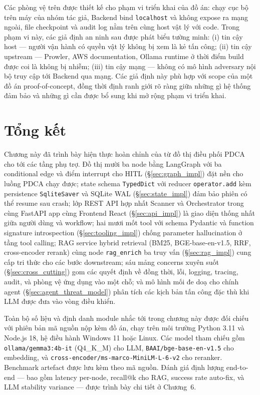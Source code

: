 Các phòng vệ trên được thiết kế cho phạm vi triển khai của đồ án: \sysname{} chạy cục bộ trên máy của nhóm tác giả, Backend bind \texttt{localhost} và không expose ra mạng ngoài, file checkpoint và audit log nằm trên cùng host vật lý với code. Trong phạm vi này, các giả định an ninh sau được phát biểu tường minh: (i) tin cậy host --- người vận hành có quyền vật lý không bị xem là kẻ tấn công; (ii) tin cậy upstream --- Prowler, AWS documentation, Ollama runtime ở thời điểm build được coi là không bị nhiễm; (iii) tin cậy mạng --- không có mô hình adversary nội bộ truy cập tới Backend qua mạng. Các giả định này phù hợp với scope của một đồ án proof-of-concept, đồng thời định ranh giới rõ ràng giữa những gì hệ thống đảm bảo và những gì cần được bổ sung khi mở rộng phạm vi triển khai.



\section{Tổng kết}
\label{sec:impl_summary}

Chương này đã trình bày hiện thực hoàn chỉnh của \sysname{} từ đồ thị điều phối PDCA cho tới các tầng phụ trợ. Đồ thị mười ba node bằng LangGraph với ba conditional edge và điểm interrupt cho HITL (\S\ref{sec:graph_impl}) đặt nền cho luồng PDCA chạy được; state schema \texttt{TypedDict} với reducer \texttt{operator.add} kèm persistence \texttt{SqliteSaver} và SQLite WAL (\S\ref{sec:state_impl}) đảm bảo phiên có thể resume sau crash; lớp REST API hợp nhất Scanner và Orchestrator trong cùng FastAPI app cùng Frontend React (\S\ref{sec:api_impl}) là giao diện thống nhất giữa người dùng và workflow; hai mươi mốt tool với schema Pydantic và function signature introspection (\S\ref{sec:tooling_impl}) chống parameter hallucination ở tầng tool calling; RAG service hybrid retrieval (BM25, BGE-base-en-v1.5, RRF, cross-encoder rerank) cùng node \texttt{rag\_enrich} ba truy vấn (\S\ref{sec:rag_impl}) cung cấp tri thức cho các bước downstream; sáu mảng concerns xuyên suốt (\S\ref{sec:cross_cutting}) gom các quyết định về đồng thời, lỗi, logging, tracing, audit, và phòng vệ ứng dụng vào một chỗ; và mô hình mối đe doạ cho chính agent (\S\ref{sec:agent_threat_model}) phân tích các kịch bản tấn công đặc thù khi LLM được đưa vào vòng điều khiển.

Toàn bộ số liệu và định danh module nhắc tới trong chương này được đối chiếu với phiên bản mã nguồn nộp kèm đồ án, chạy trên môi trường Python 3.11 và Node.js 18, hệ điều hành Windows 11 hoặc Linux. Các model tham chiếu gồm \texttt{ollama/gemma3:4b-it} (Q4\_K\_M) cho LLM, \texttt{BAAI/bge-base-en-v1.5} cho embedding, và \texttt{cross-encoder/ms-marco-MiniLM-L-6-v2} cho reranker. Benchmark artefact được lưu kèm theo mã nguồn. Đánh giá định lượng end-to-end — bao gồm latency per-node, recall@k cho RAG, success rate auto-fix, và LLM stability variance — được trình bày chi tiết ở Chương~6.


